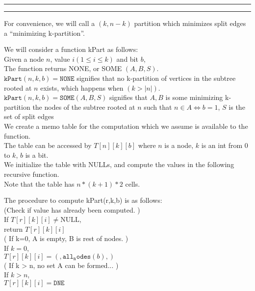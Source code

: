 \documentclass[11pt]{article}
\newcommand{\question}[2] {\vspace{.25in} \hrule\vspace{0.5em}
\noindent{\bf #1: #2} \vspace{0.5em}
\hrule \vspace{.10in}}
\begin{document}
\question{3}{Color Me Red, Color Me Blue}

\newcommand{\rright}[0]{\texttt{r-{\textgreater}right }}
\newcommand{\rleft}[0]{\texttt{r-{\textless}left }}

\newcommand{\mrleft}[0]{\mathtt{r->left }}
\newcommand{\mrright}[0]{\mathtt{r->right }}

For convenience, we will call a $(k,n-k)$ partition which minimizes split edges a ``minimizing k-partition''.

We will consider a function kPart as follows:\\

Given a node $n$, value $i (1 \leq i \leq k)$ and bit $b$,\\
The function returns NONE, or SOME $(A,B,S)$.\\

$\mathtt{kPart}(n,k,b) = \mathtt{NONE}$ signifies that no k-partition of vertices in the subtree rooted at $n$ exists, which happens when $(k > |n|)$. \\
$\mathtt{kPart}(n,k,b) = \mathtt{SOME}(A,B,S)$ signifies that $A,B$ is some minimizing k-partition the nodes of the subtree rooted at $n$ such that $n \in A \iff b = 1$, $S$ is the set of split edges\\


We create a memo table for the computation which we assume is available to the function.\\
The table can be accessed by $T[n][k][b]$ where $n$ is a node, $k$ is an int from 0 to $k$, $b$ is a bit.\\
We initialize the table with NULLs, and compute the values in the following recursive function.\\
Note that the table has $n*(k+1)*2$ cells.

The procedure to compute kPart(r,k,b) is as follows:\\
    (Check if value has already been computed. )\\
    If $T[r][k][i] \neq \text{NULL}$,\\
       return $T[r][k][i]$\\
    ( If k=0, A is empty, B is rest of nodes. )\\
    If $k = 0$,\\
       $T[r][k][i] = ({}, {\mathtt{all_nodes}(b)}, {})$\\
    ( If k > n, no set A can be formed... )\\
    If $k > n$,\\
       $T[r][k][i] = \mathtt{DNE}$
\end{document}
